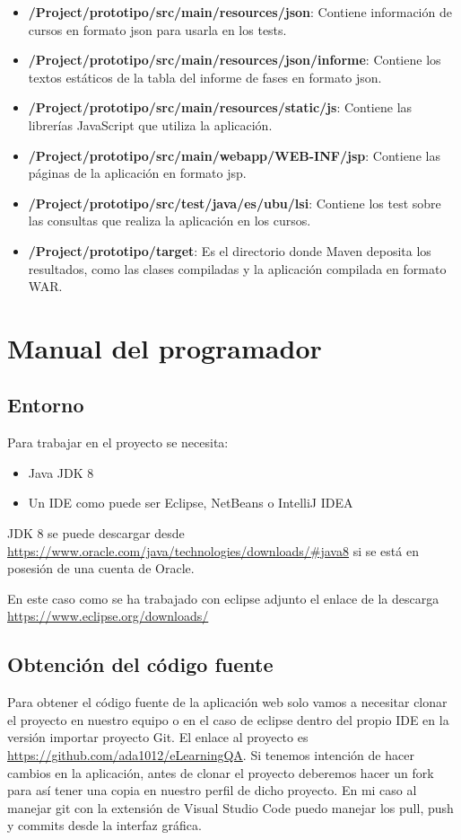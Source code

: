 \begin{itemize}
	\item \textbf{/Project/prototipo/src/main/resources/json}: Contiene información de cursos en formato json para usarla en los tests.
	\item \textbf{/Project/prototipo/src/main/resources/json/informe}: Contiene los textos estáticos de la tabla del informe de fases en formato json.
	\item \textbf{/Project/prototipo/src/main/resources/static/js}: Contiene las librerías JavaScript que utiliza la aplicación.
	\item \textbf{/Project/prototipo/src/main/webapp/WEB-INF/jsp}: Contiene las páginas de la aplicación en formato jsp.
	\item \textbf{/Project/prototipo/src/test/java/es/ubu/lsi}: Contiene los test sobre las consultas que realiza la aplicación en los cursos.
	\item \textbf{/Project/prototipo/target}: Es el directorio donde Maven deposita los resultados, como las clases compiladas y la aplicación compilada en formato WAR.
	
\end{itemize}
\section{Manual del programador}
\subsection{Entorno}
Para trabajar en el proyecto se necesita:
\begin{itemize}
	\item Java JDK 8
	\item Un IDE como puede ser Eclipse, NetBeans o IntelliJ IDEA
\end{itemize}

JDK 8 se puede descargar desde \url{https://www.oracle.com/java/technologies/downloads/#java8} si se está en posesión de una cuenta de Oracle.

En este caso como se ha trabajado con eclipse adjunto el enlace de la descarga \url{https://www.eclipse.org/downloads/}

\subsection{Obtención del código fuente}
Para obtener el código fuente de la aplicación web solo vamos a necesitar clonar el proyecto en nuestro equipo o en el caso de eclipse dentro del propio IDE en la versión importar proyecto Git. El enlace al proyecto es \url{https://github.com/ada1012/eLearningQA}. Si tenemos intención de hacer cambios en la aplicación, antes de clonar el proyecto deberemos hacer un fork para así tener una copia en nuestro perfil de dicho proyecto. En mi caso al manejar git con la extensión de Visual Studio Code puedo manejar los pull, push y commits desde la interfaz gráfica.
